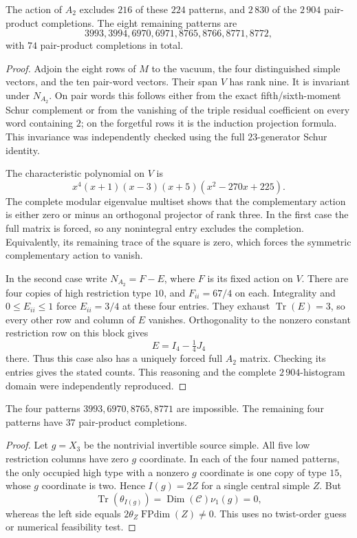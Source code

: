 \begin{proposition}
The action of $A_2$ excludes $216$ of these $224$ patterns, and $2\,830$
of the $2\,904$ pair-product completions.  The eight remaining patterns
are
\[
 3993,3994,6970,6971,8765,8766,8771,8772,
\]
with $74$ pair-product completions in total.
\end{proposition}
\begin{proof}
Adjoin the eight rows of $M$ to the vacuum, the four distinguished
simple vectors, and the ten pair-word vectors.  Their span $V$ has rank
nine.  It is invariant under $N_{A_2}$.  On pair words this follows either
from the exact fifth/sixth-moment Schur complement or from the vanishing
of the triple residual coefficient on every word containing $2$; on the
forgetful rows it is the induction projection formula.  This invariance
was independently checked using the full $23$-generator Schur identity.

The characteristic polynomial on $V$ is
\[
 x^4(x+1)(x-3)(x+5)(x^2-270x+225).
\]
The complete modular eigenvalue multiset shows that the complementary
action is either zero or minus an orthogonal projector of rank three.
In the first case the full matrix is forced, so any nonintegral entry
excludes the completion.  Equivalently, its remaining trace of the square
is zero, which forces the symmetric complementary action to vanish.

In the second case write $N_{A_2}=F-E$, where $F$ is its fixed action
on $V$.  There are four copies of high restriction type $10$, and
$F_{ii}=67/4$ on each.  Integrality and $0\leq E_{ii}\leq1$ force
$E_{ii}=3/4$ at these four entries.  They exhaust $\operatorname{Tr}(E)=3$,
so every other row and column of $E$ vanishes.  Orthogonality to the
nonzero constant restriction row on this block gives
\[
 E=I_4-\tfrac14 J_4
\]
there.  Thus this case also has a uniquely forced full $A_2$ matrix.
Checking its entries gives the stated counts.  This reasoning and the
complete $2\,904$-histogram domain were independently reproduced.
\end{proof}

\begin{proposition}
The four patterns $3993,6970,8765,8771$ are impossible.  The remaining
four patterns have $37$ pair-product completions.
\end{proposition}
\begin{proof}
Let $g=X_3$ be the nontrivial invertible source simple.  All five low
restriction columns have zero $g$ coordinate.  In each of the four named
patterns, the only occupied high type with a nonzero $g$ coordinate is
one copy of type $15$, whose $g$ coordinate is two.  Hence $I(g)=2Z$
for a single central simple $Z$.  But
\[
 \operatorname{Tr}(\theta_{I(g)})
 =\operatorname{Dim}(\mathcal C)\nu_1(g)=0,
\]
whereas the left side equals $2\theta_Z\operatorname{FPdim}(Z)\ne0$.
This uses no twist-order guess or numerical feasibility test.
\end{proof}

